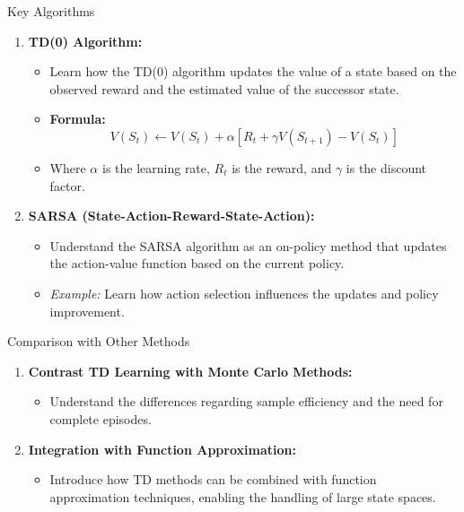 \documentclass[aspectratio=169]{beamer}
\begin{document}
\begin{frame}[fragile]{Key Algorithms}
    \begin{enumerate}
        \item \textbf{TD(0) Algorithm:}
            \begin{itemize}
                \item Learn how the TD(0) algorithm updates the value of a state based on the observed reward and the estimated value of the successor state.
                \item \textbf{Formula:}
                \begin{equation}
                    V(S_t) \leftarrow V(S_t) + \alpha \left[ R_t + \gamma V(S_{t+1}) - V(S_t) \right]
                \end{equation}
                \item Where \( \alpha \) is the learning rate, \( R_t \) is the reward, and \( \gamma \) is the discount factor.
            \end{itemize}
        \item \textbf{SARSA (State-Action-Reward-State-Action):}
            \begin{itemize}
                \item Understand the SARSA algorithm as an on-policy method that updates the action-value function based on the current policy.
                \item \textit{Example:} Learn how action selection influences the updates and policy improvement.
            \end{itemize}
    \end{enumerate}
\end{frame}

\begin{frame}[fragile]{Comparison with Other Methods}
    \begin{enumerate}
        \item \textbf{Contrast TD Learning with Monte Carlo Methods:}
            \begin{itemize}
                \item Understand the differences regarding sample efficiency and the need for complete episodes.
            \end{itemize}
        \item \textbf{Integration with Function Approximation:}
            \begin{itemize}
                \item Introduce how TD methods can be combined with function approximation techniques, enabling the handling of large state spaces.
            \end{itemize}
    \end{enumerate}
\end{frame}
\end{document}
